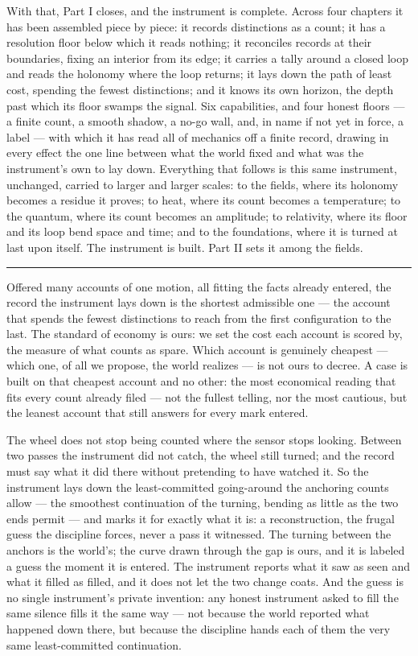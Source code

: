 With that, Part I closes, and the instrument is complete. Across four chapters it has been assembled piece by
piece: it records distinctions as a count; it has a resolution floor below which it reads nothing; it
reconciles records at their boundaries, fixing an interior from its edge; it carries a tally around a closed
loop and reads the holonomy where the loop returns; it lays down the path of least cost, spending the fewest
distinctions; and it knows its own horizon, the depth past which its floor swamps the signal. Six
capabilities, and four honest floors --- a finite count, a smooth shadow, a no-go wall, and, in name if not
yet in force, a label --- with which it has read all of mechanics off a finite record, drawing in every effect
the one line between what the world fixed and what was the instrument's own to lay down. Everything that
follows is this same instrument, unchanged, carried to larger and larger scales: to the fields, where its
holonomy becomes a residue it proves; to heat, where its count becomes a temperature; to the quantum, where
its count becomes an amplitude; to relativity, where its floor and its loop bend space and time; and to the
foundations, where it is turned at last upon itself. The instrument is built. Part II sets it among the
fields.

\bigskip
\begin{center}
\rule{0.4\textwidth}{0.4pt}
\end{center}
\bigskip

\noindent Offered many accounts of one motion, all fitting the facts already entered, the record the
instrument lays down is the shortest admissible one --- the account that spends the fewest distinctions to
reach from the first configuration to the last. The standard of economy is ours: we set the cost each account
is scored by, the measure of what counts as spare. Which account is genuinely cheapest --- which one, of all we
propose, the world realizes --- is not ours to decree. A case is built on that cheapest account and no other:
the most economical reading that fits every count already filed --- not the fullest telling, nor the most
cautious, but the leanest account that still answers for every mark entered.

The wheel does not stop being counted where the sensor stops looking. Between two passes the instrument did not
catch, the wheel still turned; and the record must say what it did there without pretending to have watched it.
So the instrument lays down the least-committed going-around the anchoring counts allow --- the smoothest
continuation of the turning, bending as little as the two ends permit --- and marks it for exactly what it is: a
reconstruction, the frugal guess the discipline forces, never a pass it witnessed. The turning between the
anchors is the world's; the curve drawn through the gap is ours, and it is labeled a guess the moment it is
entered. The instrument reports what it saw as seen and what it filled as filled, and it does not let the two
change coats. And the guess is no single instrument's private invention: any honest instrument asked to fill
the same silence fills it the same way --- not because the world reported what happened down there, but because
the discipline hands each of them the very same least-committed continuation.

